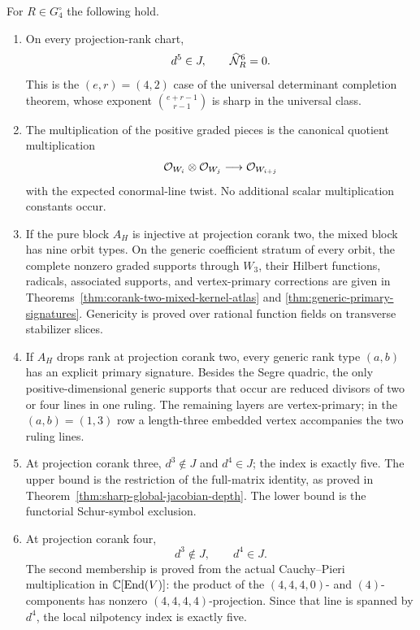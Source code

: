 \begin{theorem}
\label{thm:main-depth}
For \(R\in G_4^\circ\) the following hold.
\begin{enumerate}
\item On every projection-rank chart,
\[
 d^5\in J,\qquad \widehat{\mathcal N}_R^6=0.
\]
This is the \((e,r)=(4,2)\) case of the universal determinant
completion theorem, whose exponent
\(\binom{e+r-1}{r-1}\) is sharp in the universal class.

\item The multiplication of the positive graded pieces is the
canonical quotient multiplication
\[
 \mathcal O_{W_i}\otimes\mathcal O_{W_j}\longrightarrow\mathcal O_{W_{i+j}}
\]
with the expected conormal-line twist.  No additional scalar
multiplication constants occur.

\item If the pure block \(A_H\) is injective at projection corank
two, the mixed block has nine orbit types.  On the generic
coefficient stratum of every orbit, the complete nonzero graded
supports through \(W_3\), their Hilbert functions, radicals,
associated supports, and vertex-primary corrections are given in
Theorems~\ref{thm:corank-two-mixed-kernel-atlas} and
\ref{thm:generic-primary-signatures}.  Genericity is proved over
rational function fields on transverse stabilizer slices.

\item If \(A_H\) drops rank at projection corank two, every
generic rank type \((a,b)\) has an explicit primary signature.
Besides the Segre quadric, the only positive-dimensional generic
supports that occur are reduced divisors of two or four lines in one
ruling.  The remaining layers are vertex-primary; in the
\((a,b)=(1,3)\) row a length-three embedded vertex accompanies
the two ruling lines.

\item At projection corank three, \(d^3\notin J\) and
\(d^4\in J\); the index is exactly five.  The upper bound is the
restriction of the full-matrix identity, as proved in
Theorem~\ref{thm:sharp-global-jacobian-depth}.  The lower bound is
the functorial Schur-symbol exclusion.

\item At projection corank four,
\[
 d^3\notin J,\qquad d^4\in J.
\]
The second membership is proved from the actual Cauchy--Pieri
multiplication in \(\mathbb C[\operatorname{End}(V)]\): the product of the
\((4,4,4,0)\)- and \((4)\)-components has nonzero
\((4,4,4,4)\)-projection.  Since that line is spanned by
\(d^4\), the local nilpotency index is exactly five.
\end{enumerate}
\end{theorem}

